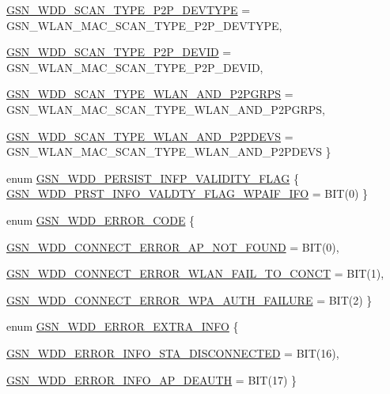 \begin{DoxyCompactItemize}
\par
\hyperlink{a00603_a8d2389f013d584eba4f8f16644b2e20ea196eb42f48f9fc74486f5f14b45b3f1b}{GSN\_\-WDD\_\-SCAN\_\-TYPE\_\-P2P\_\-DEVTYPE} =  GSN\_\-WLAN\_\-MAC\_\-SCAN\_\-TYPE\_\-P2P\_\-DEVTYPE, 
\par
\hyperlink{a00603_a8d2389f013d584eba4f8f16644b2e20eaa496ea0cb908b4ea08fb52eb55df53b5}{GSN\_\-WDD\_\-SCAN\_\-TYPE\_\-P2P\_\-DEVID} =  GSN\_\-WLAN\_\-MAC\_\-SCAN\_\-TYPE\_\-P2P\_\-DEVID, 
\par
\hyperlink{a00603_a8d2389f013d584eba4f8f16644b2e20ea4ce55e81e91942fe5fb366fc4df7642d}{GSN\_\-WDD\_\-SCAN\_\-TYPE\_\-WLAN\_\-AND\_\-P2PGRPS} =  GSN\_\-WLAN\_\-MAC\_\-SCAN\_\-TYPE\_\-WLAN\_\-AND\_\-P2PGRPS, 
\par
\hyperlink{a00603_a8d2389f013d584eba4f8f16644b2e20ea1b7aa5aaa334bb1b4b4480e880ff4920}{GSN\_\-WDD\_\-SCAN\_\-TYPE\_\-WLAN\_\-AND\_\-P2PDEVS} =  GSN\_\-WLAN\_\-MAC\_\-SCAN\_\-TYPE\_\-WLAN\_\-AND\_\-P2PDEVS
 \}
\item 
enum \hyperlink{a00603_a12a943db28b7331351c75b7c2105966d}{GSN\_\-WDD\_\-PERSIST\_\-INFP\_\-VALIDITY\_\-FLAG} \{ \hyperlink{a00603_a12a943db28b7331351c75b7c2105966da37cf6cc897d0f9dbd3eb7a07fd080e96}{GSN\_\-WDD\_\-PRST\_\-INFO\_\-VALDTY\_\-FLAG\_\-WPAIF\_\-IFO} =  BIT(0)
 \}
\item 
enum \hyperlink{a00603_ab5fdb01131bac4294899f4261109f072}{GSN\_\-WDD\_\-ERROR\_\-CODE} \{ \par
\hyperlink{a00603_ab5fdb01131bac4294899f4261109f072a7a061cad77c96f63ddc154fff979a42b}{GSN\_\-WDD\_\-CONNECT\_\-ERROR\_\-AP\_\-NOT\_\-FOUND} =  BIT(0), 
\par
\hyperlink{a00603_ab5fdb01131bac4294899f4261109f072aca2cbf14ed14f62891aba17f4e4d9540}{GSN\_\-WDD\_\-CONNECT\_\-ERROR\_\-WLAN\_\-FAIL\_\-TO\_\-CONCT} =  BIT(1), 
\par
\hyperlink{a00603_ab5fdb01131bac4294899f4261109f072af1e25f53b0d7a8f18eb969521abc484f}{GSN\_\-WDD\_\-CONNECT\_\-ERROR\_\-WPA\_\-AUTH\_\-FAILURE} =  BIT(2)
 \}
\item 
enum \hyperlink{a00603_a25ca4f0a075752eaf99103b405458b83}{GSN\_\-WDD\_\-ERROR\_\-EXTRA\_\-INFO} \{ \par
\hyperlink{a00603_a25ca4f0a075752eaf99103b405458b83a5b993b9a23adbfc2ceb2e82ff2b35908}{GSN\_\-WDD\_\-ERROR\_\-INFO\_\-STA\_\-DISCONNECTED} =  BIT(16), 
\par
\hyperlink{a00603_a25ca4f0a075752eaf99103b405458b83af6b76f54dcae7b9e57e68275d89b2de9}{GSN\_\-WDD\_\-ERROR\_\-INFO\_\-AP\_\-DEAUTH} =  BIT(17)
 \}
\item 

\end{DoxyCompactItemize}
